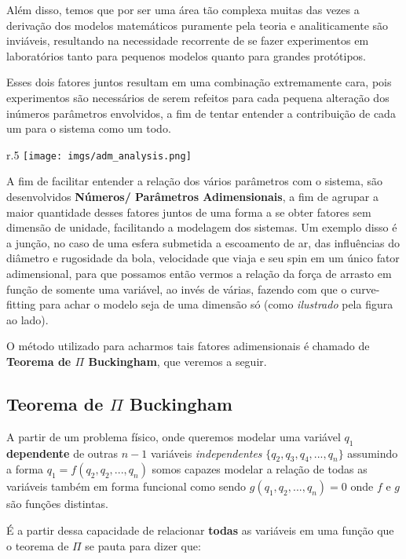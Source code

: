 \documentclass{article}
\begin{document}
Além disso, temos que por ser uma área tão complexa muitas das vezes a derivação dos modelos matemáticos puramente pela teoria e analiticamente são inviáveis, resultando na necessidade recorrente de se fazer experimentos
em laboratórios tanto para pequenos modelos quanto para grandes protótipos.

Esses dois fatores juntos resultam em uma combinação extremamente cara, pois experimentos são necessários de serem refeitos para cada pequena alteração dos inúmeros parâmetros envolvidos, a fim de tentar entender a contribuição de cada um para o sistema como um todo.

\begin{wrapfigure}{r}{.5\textwidth}
    \centering
    \texttt{[image: imgs/adm\_analysis.png]}
\end{wrapfigure}

A fim de facilitar entender a relação dos vários parâmetros com o sistema, são desenvolvidos \textbf{Números/ Parâmetros Adimensionais}, a fim de agrupar a maior quantidade desses fatores juntos de uma forma
a se obter fatores sem dimensão de unidade, facilitando a modelagem dos sistemas. Um exemplo disso é a junção, no caso de uma esfera submetida a escoamento de ar, das influências do diâmetro e rugosidade da bola, velocidade que viaja e seu spin em um único fator adimensional, para que possamos então vermos a relação da força de arrasto em função de somente uma variável, ao invés de várias, fazendo com que
o curve-fitting para achar o modelo seja de uma dimensão só (como \emph{ilustrado} pela figura ao lado).

O método utilizado para acharmos tais fatores adimensionais é chamado de \textbf{Teorema de $\Pi$ Buckingham}, que veremos a seguir.

\subsection{Teorema de $\Pi$ Buckingham}

A partir de um problema físico, onde queremos modelar uma variável $q_1$ \textbf{dependente} de outras $n-1$ variáveis \emph{independentes} $\{q_2, q_3, q_4, ..., q_{n}\}$ assumindo a forma $q_1 = f(q_2, q_2, ..., q_n)$ somos capazes modelar a relação de todas as variáveis também em forma funcional como sendo $g(q_1, q_2, ..., q_n) = 0$ onde $f$ e $g$ são funções distintas.

É a partir dessa capacidade de relacionar \textbf{todas} as variáveis em uma função que o teorema de $\Pi$ se pauta para dizer que:
\end{document}
